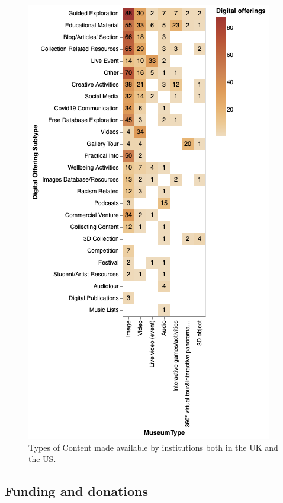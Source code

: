 \documentclass{egpubl}
\begin{document}
\begin{figure}[h]
  \centering
  \includegraphics[width=\linewidth]{images/typescontent.png}
  \caption{\label{fig:contenttype}
            Types of Content made available by institutions both in the UK and the US.}
\end{figure}

\subsection{Funding and donations}
\label{don}
\end{document}
